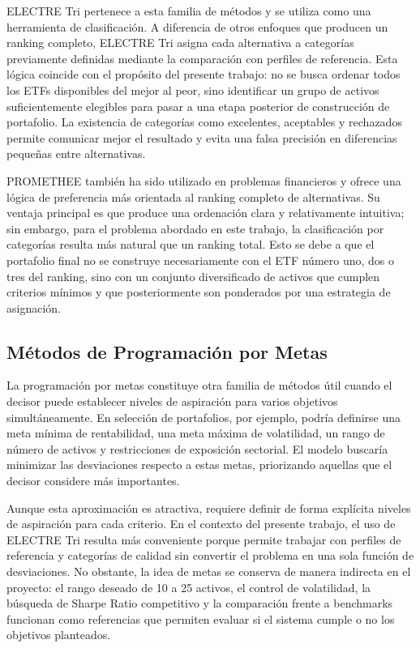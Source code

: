 \documentclass[12pt,letterpaper]{article}
\begin{document}
ELECTRE Tri pertenece a esta familia de métodos y se utiliza como una herramienta de clasificación. A diferencia de otros enfoques que producen un ranking completo, ELECTRE Tri asigna cada alternativa a categorías previamente definidas mediante la comparación con perfiles de referencia. Esta lógica coincide con el propósito del presente trabajo: no se busca ordenar todos los ETFs disponibles del mejor al peor, sino identificar un grupo de activos suficientemente elegibles para pasar a una etapa posterior de construcción de portafolio. La existencia de categorías como excelentes, aceptables y rechazados permite comunicar mejor el resultado y evita una falsa precisión en diferencias pequeñas entre alternativas.

PROMETHEE también ha sido utilizado en problemas financieros y ofrece una lógica de preferencia más orientada al ranking completo de alternativas. Su ventaja principal es que produce una ordenación clara y relativamente intuitiva; sin embargo, para el problema abordado en este trabajo, la clasificación por categorías resulta más natural que un ranking total. Esto se debe a que el portafolio final no se construye necesariamente con el ETF número uno, dos o tres del ranking, sino con un conjunto diversificado de activos que cumplen criterios mínimos y que posteriormente son ponderados por una estrategia de asignación.

\subsection{Métodos de Programación por Metas}

La programación por metas constituye otra familia de métodos útil cuando el decisor puede establecer niveles de aspiración para varios objetivos simultáneamente. En selección de portafolios, por ejemplo, podría definirse una meta mínima de rentabilidad, una meta máxima de volatilidad, un rango de número de activos y restricciones de exposición sectorial. El modelo buscaría minimizar las desviaciones respecto a estas metas, priorizando aquellas que el decisor considere más importantes.

Aunque esta aproximación es atractiva, requiere definir de forma explícita niveles de aspiración para cada criterio. En el contexto del presente trabajo, el uso de ELECTRE Tri resulta más conveniente porque permite trabajar con perfiles de referencia y categorías de calidad sin convertir el problema en una sola función de desviaciones. No obstante, la idea de metas se conserva de manera indirecta en el proyecto: el rango deseado de 10 a 25 activos, el control de volatilidad, la búsqueda de Sharpe Ratio competitivo y la comparación frente a benchmarks funcionan como referencias que permiten evaluar si el sistema cumple o no los objetivos planteados.
\end{document}
